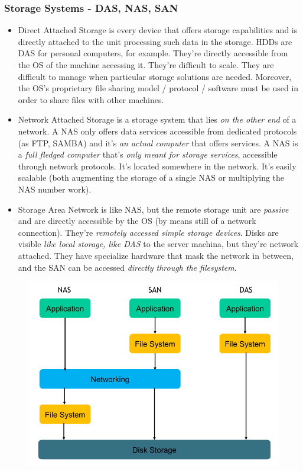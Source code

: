 \documentclass[10pt,a4paper]{article}
\begin{document}
				\subsubsection{Storage Systems - DAS, NAS, SAN}
					\begin{itemize}
						\item Direct Attached Storage is every device that offers storage capabilities and is directly attached to the unit processing such data in the storage. HDDs are DAS for personal computers, for example. They're directly accessible from the OS of the machine accessing it. They're difficult to scale. They are difficult to manage when particular storage solutions are needed. Moreover, the OS's proprietary file sharing model / protocol / software must be used in order to share files with other machines.
						\item Network Attached Storage is a storage system that lies \emph{on the other end} of a network. A NAS only offers data services accessible from dedicated protocols (as FTP, SAMBA) and it's \emph{an actual computer} that offers services. A NAS is a \emph{full fledged computer} that's \emph{only meant for storage services}, accessible through network protocols. It's located somewhere in the network. It's easily scalable (both augmenting the storage of a single NAS or multiplying the NAS number work).
						\item Storage Area Network is like NAS, but the remote storage unit are \emph{passive} and are directly accessible by the OS (by means still of a network connection). They're \emph{remotely accessed simple storage devices}. Disks are visible \emph{like local storage, like DAS} to the server machina, but they're network attached. They have specialize hardware that mask the network in between, and the SAN can be accessed \emph{directly through the filesystem}. 
					\end{itemize}
					\begin{figure}[H]
						\centering
						\includegraphics[width = \textwidth]{./images/storage.png}
					\end{figure}
					
\end{document}
